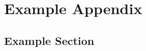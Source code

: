 
\chapter{Example Appendix}
\label{app:example}

\section{Example Section}
\label{sec:app.example.examplesec}

\lipsum[5-6]

